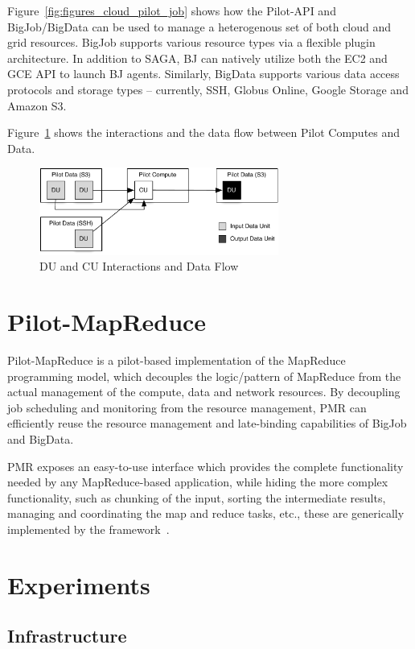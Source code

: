 \documentclass[times]{cpeauth}
\begin{document}
Figure~\ref{fig:figures_cloud_pilot_job} shows how the Pilot-API and 
BigJob/BigData can be used to manage a heterogenous set of both cloud and grid 
resources. BigJob supports various resource types via a flexible plugin 
architecture. In addition to SAGA, BJ can natively utilize both the EC2 and 
GCE API to launch BJ agents. Similarly, BigData supports various data access
protocols and storage types -- currently, SSH, Globus Online, Google Storage
and Amazon S3.

Figure~\ref{fig:figures_data-flow} shows the interactions and the data flow 
between Pilot Computes and Data.
\begin{figure}[htbp]
	\centering
		\includegraphics[width=0.7\textwidth]{figures/data-flow.pdf}
	\caption{DU and CU Interactions and Data Flow}
	\label{fig:figures_data-flow}
\end{figure}



\section{Pilot-MapReduce}
Pilot-MapReduce is a pilot-based implementation of the MapReduce
programming model, which decouples the logic/pattern of MapReduce from
the actual management of the compute, data and network resources. By
decoupling job scheduling and monitoring from the resource management,
PMR can efficiently reuse the resource management and late-binding
capabilities of BigJob and BigData.

PMR exposes an easy-to-use interface which provides the complete
functionality needed by any MapReduce-based application, while hiding
the more complex functionality, such as chunking of the input, sorting
the intermediate results, managing and coordinating the map and reduce
tasks, etc., these are generically implemented by the
framework~\cite{pmr2012}.

\section{Experiments}

\subsection{Infrastructure}
\end{document}
